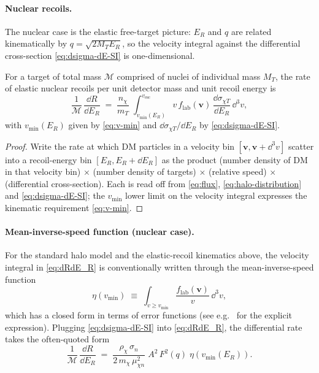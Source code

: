 \paragraph{Nuclear recoils.}
The nuclear case is the elastic free-target picture: $E_R$ and
$q$ are related kinematically by $q=\sqrt{2 M_T E_R}$, so the
velocity integral against the differential cross-section
\cref{eq:dsigma-dE-SI} is one-dimensional.

\begin{statement}
\label{stmt:dRdE}
For a target of total mass $\mathcal{M}$ comprised of nuclei of
individual mass $M_T$, the rate of elastic nuclear recoils per
unit detector mass and unit recoil energy is
\begin{equation}
\label{eq:dRdE_R}
\frac{1}{\mathcal M}\,\frac{\dd R}{\dd E_R}
\;=\; \frac{n_\chi}{m_T}\;\int_{v_\text{min}(E_R)}^{v_\text{esc}}\!\!
v\,f_\text{lab}(\bm v)\,\frac{\dd\sigma_{\chi T}}{\dd E_R}\,\dd^3v,
\end{equation}
with $v_\text{min}(E_R)$ given by \cref{eq:v-min} and
$\dd\sigma_{\chi T}/\dd E_R$ by \cref{eq:dsigma-dE-SI}.
\end{statement}

\begin{proof}
Write the rate at which DM particles in a velocity bin
$[\bm v,\bm v+\dd^3 v]$ scatter into a recoil-energy bin
$[E_R,E_R+\dd E_R]$ as the product (number density of DM in that
velocity bin) $\times$ (number density of targets) $\times$
(relative speed) $\times$ (differential cross-section). Each is
read off from \cref{eq:flux}, \cref{eq:halo-distribution} and
\cref{eq:dsigma-dE-SI}; the $v_\text{min}$ lower limit on the
velocity integral expresses the kinematic requirement
\cref{eq:v-min}.
\end{proof}

\paragraph{Mean-inverse-speed function (nuclear case).}
For the standard halo model and the elastic-recoil kinematics
above, the velocity integral in \cref{eq:dRdE_R} is conventionally
written through the mean-inverse-speed function
\begin{equation}
\label{eq:eta}
\eta(v_\text{min}) \;\equiv\; \int_{v\geq v_\text{min}}\frac{f_\text{lab}(\bm v)}{v}\,\dd^3v,
\end{equation}
which has a closed form in terms of error functions (see
e.g.~\cite{lewin1996} for the explicit expression). Plugging
\cref{eq:dsigma-dE-SI} into \cref{eq:dRdE_R}, the differential
rate takes the often-quoted form
\begin{equation}
\label{eq:dRdE-final}
\frac{1}{\mathcal M}\,\frac{\dd R}{\dd E_R}
\;=\; \frac{\rho_\chi\,\sigma_n}{2\,m_\chi\,\mu_{\chi n}^2}\;A^2\,F^2(q)\;\eta(v_\text{min}(E_R)).
\end{equation}

